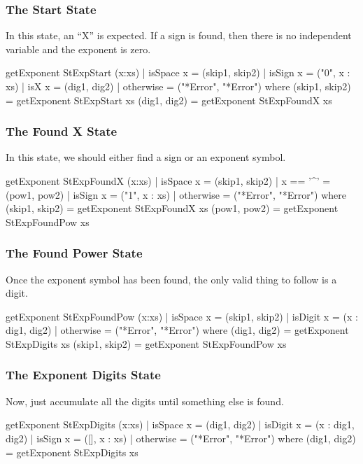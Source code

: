 \subsubsection{The Start State}
In this state, an ``X'' is expected.  If a sign is found, then there is no independent variable and the exponent is zero.
\begin{code}
getExponent StExpStart (x:xs)
  | isSpace x = (skip1, skip2)
  | isSign x  = ("0", x : xs)
  | isX x     = (dig1, dig2)
  | otherwise = ("*Error", "*Error")
    where
      (skip1, skip2) = getExponent StExpStart xs
      (dig1, dig2) = getExponent StExpFoundX xs
\end{code}
\subsubsection{The Found X State}
In this state, we should either find a sign or an exponent symbol.
\begin{code}
getExponent StExpFoundX (x:xs)
  | isSpace x    = (skip1, skip2)
  | x == '^'     = (pow1, pow2)
  | isSign x     = ("1", x : xs)
  | otherwise    = ("*Error", "*Error")
    where
      (skip1, skip2) = getExponent StExpFoundX xs
      (pow1, pow2) = getExponent StExpFoundPow xs
\end{code}
\subsubsection{The Found Power State}
Once the exponent symbol has been found, the only valid thing to follow is a digit.
\begin{code}
getExponent StExpFoundPow (x:xs)
  | isSpace x = (skip1, skip2)
  | isDigit x = (x : dig1, dig2)
  | otherwise = ("*Error", "*Error")
    where
      (dig1, dig2) = getExponent StExpDigits xs
      (skip1, skip2) = getExponent StExpFoundPow xs
\end{code}
\subsubsection{The Exponent Digits State}
Now, just accumulate all the digits until something else is found.
\begin{code}
getExponent StExpDigits (x:xs)
  | isSpace x = (dig1, dig2)
  | isDigit x = (x : dig1, dig2)
  | isSign x  = ([], x : xs)
  | otherwise = ("*Error", "*Error")
    where
      (dig1, dig2) = getExponent StExpDigits xs
\end{code}


